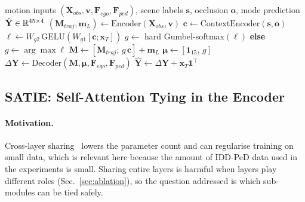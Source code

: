 \begin{algorithm}[t]
\caption{SAGE admission gating and MASC memory augmentation}\label{alg:gate}
\begin{algorithmic}[1]
\Require motion inputs $(\mathbf{X}_{obs},\mathbf{v},\mathbf{F}_{ego},\mathbf{F}_{ped})$, scene labels $\mathbf{s}$, occlusion $\mathbf{o}$, mode
\Ensure prediction $\hat{\mathbf{Y}}\in\mathbb{R}^{45\times4}$
\State $(\mathbf{M}_{traj},\mathbf{m}_L)\gets\mathrm{Encoder}(\mathbf{X}_{obs},\mathbf{v})$ 
\State $\mathbf{c}\gets\mathrm{ContextEncoder}(\mathbf{s},\mathbf{o})$ 
\State $\boldsymbol{\ell}\gets W_{g2}\,\mathrm{GELU}(W_{g1}[\mathbf{c};\mathbf{x}_T])$
 $g\gets$ hard Gumbel-softmax$(\boldsymbol{\ell})$ \textbf{else} $g\gets\arg\max\boldsymbol{\ell}$ \EndIf
\State $\mathbf{M}\gets[\mathbf{M}_{traj};\,g\,\mathbf{c}]+\mathbf{m}_L$ 
\State $\boldsymbol{\mu}\gets[\mathbf{1}_{15},\,g]$ 
\State $\Delta\mathbf{Y}\gets\mathrm{Decoder}(\mathbf{M},\boldsymbol{\mu},\mathbf{F}_{ego},\mathbf{F}_{ped})$
\State \Return $\hat{\mathbf{Y}}\gets\Delta\mathbf{Y}+\mathbf{x}_T\mathbf{1}^\top$
\end{algorithmic}
\end{algorithm}

\subsection{SATIE: Self-Attention Tying in the Encoder}\label{ssec:c4}
\paragraph{Motivation.} Cross-layer sharing~\citep{dehghani2019universal,lan2020albert} lowers the parameter count and can regularise training on small data, which is relevant here because the amount of IDD-PeD data used in the experiments is small. Sharing entire layers is harmful when layers play different roles (Sec.~\ref{sec:ablation}), so the question addressed is which sub-modules can be tied safely.

